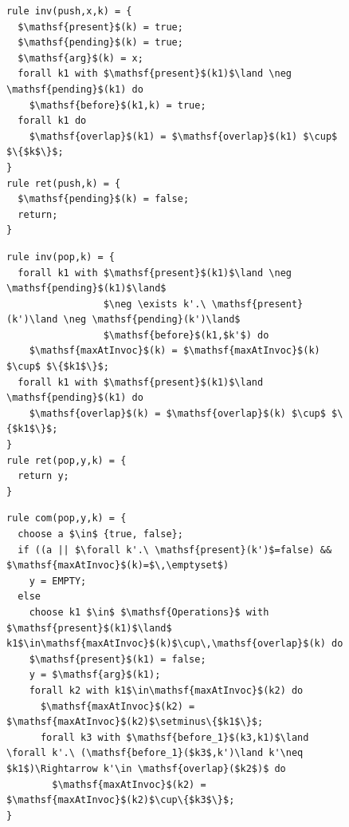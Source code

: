 \begin{figure} [t]
\vspace{-5mm}
\begin{minipage}[t]{6.5cm}
\begin{lstlisting}
rule inv(push,x,k) = {
  $\mathsf{present}$(k) = true;
  $\mathsf{pending}$(k) = true;
  $\mathsf{arg}$(k) = x;
  forall k1 with $\mathsf{present}$(k1)$\land \neg \mathsf{pending}$(k1) do
    $\mathsf{before}$(k1,k) = true;
  forall k1 do
    $\mathsf{overlap}$(k1) = $\mathsf{overlap}$(k1) $\cup$ $\{$k$\}$;
}
rule ret(push,k) = {
  $\mathsf{pending}$(k) = false;
  return;
}
\end{lstlisting}
\end{minipage}
\begin{minipage}[t]{5cm}
\begin{lstlisting}
rule inv(pop,k) = {
  forall k1 with $\mathsf{present}$(k1)$\land \neg \mathsf{pending}$(k1)$\land$
                 $\neg \exists k'.\ \mathsf{present}(k')\land \neg \mathsf{pending}(k')\land$ 
                 $\mathsf{before}$(k1,$k'$) do
    $\mathsf{maxAtInvoc}$(k) = $\mathsf{maxAtInvoc}$(k) $\cup$ $\{$k1$\}$;
  forall k1 with $\mathsf{present}$(k1)$\land \mathsf{pending}$(k1) do
    $\mathsf{overlap}$(k) = $\mathsf{overlap}$(k) $\cup$ $\{$k1$\}$;
}
rule ret(pop,y,k) = {
  return y;
}
\end{lstlisting}
\end{minipage}

\vspace{-4mm}
\begin{lstlisting}
rule com(pop,y,k) = {
  choose a $\in$ {true, false};
  if ((a || $\forall k'.\ \mathsf{present}(k')$=false) && $\mathsf{maxAtInvoc}$(k)=$\,\emptyset$) 
    y = EMPTY;
  else 
    choose k1 $\in$ $\mathsf{Operations}$ with $\mathsf{present}$(k1)$\land$ k1$\in\mathsf{maxAtInvoc}$(k)$\cup\,\mathsf{overlap}$(k) do
    $\mathsf{present}$(k1) = false;
    y = $\mathsf{arg}$(k1);
    forall k2 with k1$\in\mathsf{maxAtInvoc}$(k2) do
      $\mathsf{maxAtInvoc}$(k2) = $\mathsf{maxAtInvoc}$(k2)$\setminus\{$k1$\}$;
      forall k3 with $\mathsf{before_1}$(k3,k1)$\land \forall k'.\ (\mathsf{before_1}($k3$,k')\land k'\neq $k1$)\Rightarrow k'\in \mathsf{overlap}($k2$)$ do
        $\mathsf{maxAtInvoc}$(k2) = $\mathsf{maxAtInvoc}$(k2)$\cup\{$k3$\}$;
}
\end{lstlisting}


\end{figure}
